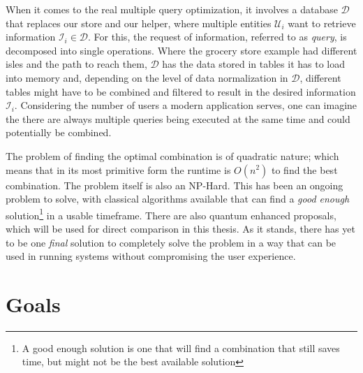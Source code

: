 When it comes to the real multiple query optimization, it involves a database $\mathcal{D}$ that replaces our store and our helper, where multiple entities $\mathcal{U}_i$ want to retrieve information $\mathcal{I}_i \in \mathcal{D}$. For this, the request of information, referred to as \emph{query}, is decomposed into single operations. Where the grocery store example had different isles and the path to reach them, $\mathcal{D}$ has the data stored in tables it has to load into memory and, depending on the level of data normalization in $\mathcal{D}$\cite{semantic_relational_data_model}, different tables might have to be combined and filtered to result in the desired information $\mathcal{I}_i$. Considering the number of users a modern application serves\cite{uber_technologies_inc_uber_2022}, one can imagine the there are always multiple queries being executed at the same time and could potentially be combined.\par
The problem of finding the optimal combination is of quadratic nature; which means that in its most primitive form the runtime is $O(n^2)$ to find the best combination. The problem itself is also an NP-Hard\cite{sellis_multiple-query_1990}. This has been an ongoing problem to solve, with classical algorithms\cite{kathuria_provable_mqo} available that can find a \emph{good enough} solution\footnote{A good enough solution is one that will find a combination that still saves time, but might not be the best available solution} in a usable timeframe. There are also quantum enhanced proposals\cite{fankhauser_multiple_2021}, which will be used for direct comparison in this thesis. As it stands, there has yet to be one \emph{final} solution to completely solve the problem in a way that can be used in running systems without compromising the user experience.

\section{Goals}

